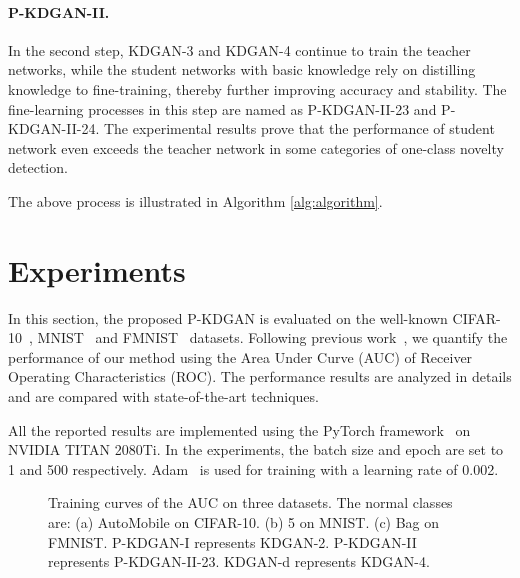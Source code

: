 \documentclass{article}
\begin{document}
	\paragraph{P-KDGAN-II.}
	In the second step, KDGAN-\normalsize{\textcircled{\footnotesize{3}}} and KDGAN-\normalsize{\textcircled{\footnotesize{4}}} continue to train the teacher networks, while the student networks with basic knowledge rely on distilling knowledge to fine-training, thereby further improving accuracy and stability. The fine-learning processes in this step are named as P-KDGAN-II-\normalsize{\textcircled{\footnotesize{2}}}\normalsize{\textcircled{\footnotesize{3}}} and P-KDGAN-II-\normalsize{\textcircled{\footnotesize{2}}}\normalsize{\textcircled{\footnotesize{4}}}. The experimental results prove that the performance of student network even exceeds the teacher network in some categories of one-class novelty detection.
	
	The above process is illustrated in Algorithm \ref{alg:algorithm}.

	
\section{Experiments}
	In this section, the proposed P-KDGAN is evaluated on the well-known CIFAR-10~\cite{CIFAR10:2009}, MNIST~\cite{MNIST:2010} and FMNIST~\cite{FMNIST:2017} datasets. Following previous work~\cite{OCGAN:2019}, we quantify the performance of our method using the Area Under Curve (AUC) of Receiver Operating Characteristics (ROC). The performance results are analyzed in details and are compared with state-of-the-art techniques.
	
	All the reported results are implemented using the PyTorch framework~\cite{pytorch} on NVIDIA TITAN 2080Ti. In the experiments, the batch size and epoch are set to 1 and 500 respectively. Adam~\cite{adam:2015} is used for training with a learning rate of 0.002.
	
	\begin{figure*}
		\centering

		\centering
		\caption{Training curves of the AUC on three datasets. The normal classes are: (a) AutoMobile on CIFAR-10. (b) 5 on MNIST. (c) Bag on FMNIST. P-KDGAN-I represents KDGAN-\normalsize{\textcircled{\footnotesize{2}}}. P-KDGAN-II represents P-KDGAN-II-\normalsize{\textcircled{\footnotesize{2}}}\normalsize{\textcircled{\footnotesize{3}}}. KDGAN-d represents KDGAN-\normalsize{\textcircled{\footnotesize{4}}}.}\label{fig:KDGAN-Vs.P-KDGAN}
	\end{figure*}
	
\end{document}
